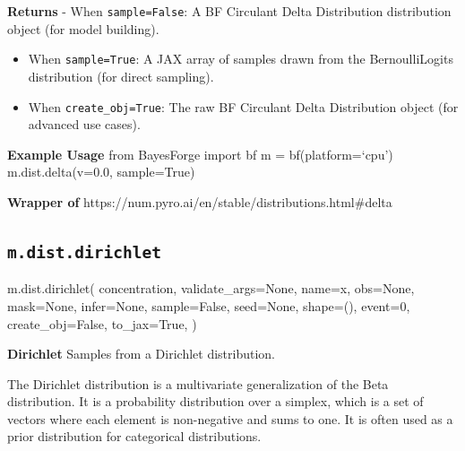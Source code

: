 \documentclass[
  letterpaper,
  DIV=11,
  numbers=noendperiod]{scrartcl}
\newenvironment{Shaded}{\begin{snugshade}}{\end{snugshade}}
\newcommand{\DecValTok}[1]{\textcolor[rgb]{0.68,0.00,0.00}{#1}}
\newcommand{\NormalTok}[1]{\textcolor[rgb]{0.00,0.23,0.31}{#1}}
\newcommand{\OperatorTok}[1]{\textcolor[rgb]{0.37,0.37,0.37}{#1}}
\newcommand{\StringTok}[1]{\textcolor[rgb]{0.13,0.47,0.30}{#1}}
\newcommand{\VariableTok}[1]{\textcolor[rgb]{0.07,0.07,0.07}{#1}}
\begin{document}
\textbf{Returns} - When \texttt{sample=False}: A BF Circulant Delta
Distribution distribution object (for model building).

\begin{itemize}
\item
  When \texttt{sample=True}: A JAX array of samples drawn from the
  BernoulliLogits distribution (for direct sampling).
\item
  When \texttt{create\_obj=True}: The raw BF Circulant Delta
  Distribution object (for advanced use cases).
\end{itemize}

\textbf{Example Usage} from BayesForge import bf m = bf(platform=`cpu')
m.dist.delta(v=0.0, sample=True)

\textbf{Wrapper of}
https://num.pyro.ai/en/stable/distributions.html\#delta

\subsection{\texorpdfstring{\texttt{m.dist.dirichlet}}{m.dist.dirichlet}}\label{dirichlet}

\begin{Shaded}
\begin{Highlighting}[]
\NormalTok{m.dist.dirichlet(}
\NormalTok{    concentration,}
\NormalTok{    validate\_args}\OperatorTok{=}\VariableTok{None}\NormalTok{,}
\NormalTok{    name}\OperatorTok{=}\StringTok{\textquotesingle{}x\textquotesingle{}}\NormalTok{,}
\NormalTok{    obs}\OperatorTok{=}\VariableTok{None}\NormalTok{,}
\NormalTok{    mask}\OperatorTok{=}\VariableTok{None}\NormalTok{,}
\NormalTok{    infer}\OperatorTok{=}\VariableTok{None}\NormalTok{,}
\NormalTok{    sample}\OperatorTok{=}\VariableTok{False}\NormalTok{,}
\NormalTok{    seed}\OperatorTok{=}\VariableTok{None}\NormalTok{,}
\NormalTok{    shape}\OperatorTok{=}\NormalTok{(),}
\NormalTok{    event}\OperatorTok{=}\DecValTok{0}\NormalTok{,}
\NormalTok{    create\_obj}\OperatorTok{=}\VariableTok{False}\NormalTok{,}
\NormalTok{    to\_jax}\OperatorTok{=}\VariableTok{True}\NormalTok{,}
\NormalTok{)}
\end{Highlighting}
\end{Shaded}

\textbf{Dirichlet} Samples from a Dirichlet distribution.

The Dirichlet distribution is a multivariate generalization of the Beta
distribution. It is a probability distribution over a simplex, which is
a set of vectors where each element is non-negative and sums to one. It
is often used as a prior distribution for categorical distributions.
\end{document}
